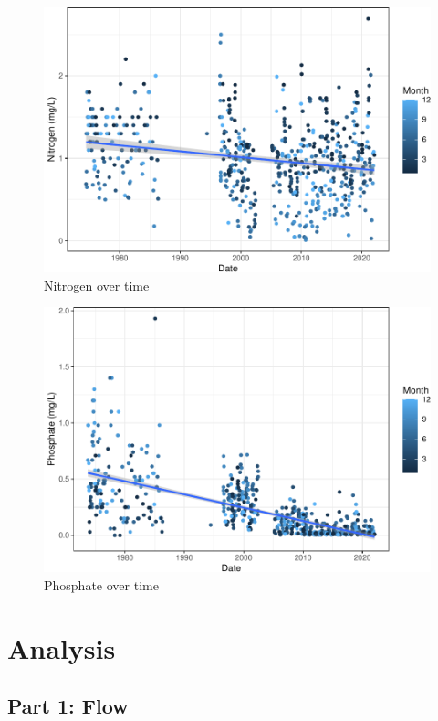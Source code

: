 \documentclass[
  12pt,
]{article}
\begin{document}
\begin{figure}
\centering
\includegraphics{Project_Script_files/figure-latex/exploration_plot3-1.pdf}
\caption{Nitrogen over time}
\end{figure}

\begin{figure}
\centering
\includegraphics{Project_Script_files/figure-latex/exploration_plot4-1.pdf}
\caption{Phosphate over time}
\end{figure}

\newpage

\hypertarget{analysis}{%
\section{Analysis}\label{analysis}}

\hypertarget{part-1-flow}{%
\subsection{Part 1: Flow}\label{part-1-flow}}
\end{document}
